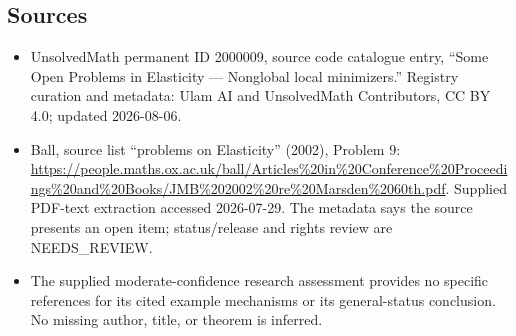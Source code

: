 \documentclass[11pt]{article}
\begin{document}
\subsection{Sources}
\begin{itemize}
\item UnsolvedMath permanent ID 2000009, source code catalogue entry, ``Some Open Problems in Elasticity --- Nonglobal local minimizers.'' Registry curation and metadata: Ulam AI and UnsolvedMath Contributors, CC BY 4.0; updated 2026-08-06.
\item Ball, source list ``problems on Elasticity'' (2002), Problem 9: \url{https://people.maths.ox.ac.uk/ball/Articles%20in%20Conference%20Proceedings%20and%20Books/JMB%202002%20re%20Marsden%2060th.pdf}. Supplied PDF-text extraction accessed 2026-07-29. The metadata says the source presents an open item; status/release and rights review are NEEDS\_REVIEW.
\item The supplied moderate-confidence research assessment provides no specific references for its cited example mechanisms or its general-status conclusion. No missing author, title, or theorem is inferred.
\end{itemize}
\end{document}
